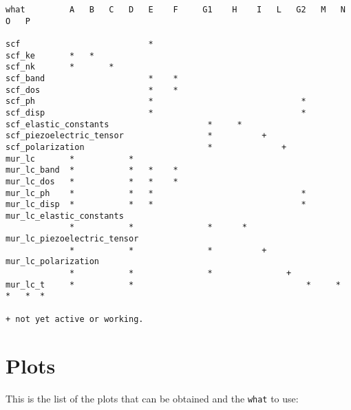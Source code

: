 \documentclass[12pt,a4paper]{article}
\begin{document}
\begin{verbatim}
what         A   B   C   D   E    F     G1    H    I   L   G2   M   N   O   P

scf                          *
scf_ke       *   *
scf_nk       *       *
scf_band                     *    *
scf_dos                      *    *
scf_ph                       *                              *
scf_disp                     *                              *
scf_elastic_constants                    *     *
scf_piezoelectric_tensor                 *          +
scf_polarization                         *              +
mur_lc       *           *
mur_lc_band  *           *   *    *
mur_lc_dos   *           *   *    *
mur_lc_ph    *           *   *                              *
mur_lc_disp  *           *   *                              *
mur_lc_elastic_constants
             *           *               *      *
mur_lc_piezoelectric_tensor
             *           *               *          +
mur_lc_polarization
             *           *               *               +
mur_lc_t     *           *                                   *     *  *   *  *

+ not yet active or working.
\end{verbatim}

\newpage

\section{\color{coral}Plots}
This is the list of the plots that can be obtained and 
the \texttt{what} to use:
\end{document}
